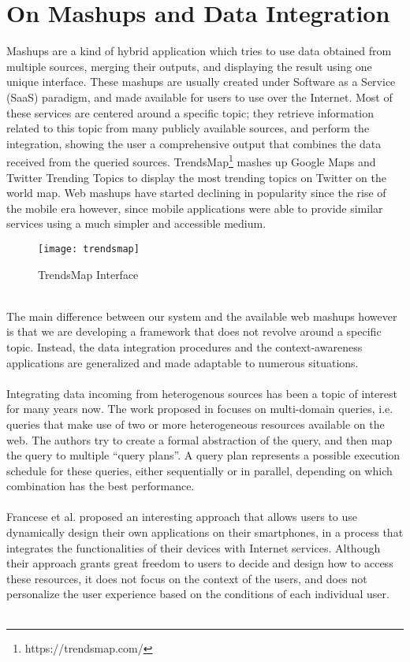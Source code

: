 \section{On Mashups and Data Integration}
Mashups are a kind of hybrid application which tries to use data obtained from multiple sources, merging their outputs, and displaying the result using one unique interface. These mashups are usually created under Software as a Service (SaaS) paradigm, and made available for users to use over the Internet. Most of these services are centered around a specific topic; they retrieve information related to this topic from many publicly available sources, and perform the integration, showing the user a comprehensive output that combines the data received from the queried sources. TrendsMap\footnote{https://trendsmap.com/} mashes up Google Maps and Twitter Trending Topics to display the most trending topics on Twitter on the world map. Web mashups have started declining in popularity since the rise of the mobile era however, since mobile applications were able to provide similar services using a much simpler and accessible medium.
\begin{figure}[h]
\centering
\texttt{[image: trendsmap]}
\caption{TrendsMap Interface}
\end{figure}
\\
The main difference between our system and the available web mashups however is that we are developing a framework that does not revolve around a specific topic. Instead, the data integration procedures and the context-awareness applications are generalized and made adaptable to numerous situations.\\\\
Integrating data incoming from heterogenous sources has been a topic of interest for many years now. The work proposed in \cite{braga} focuses on multi-domain queries, i.e. queries that make use of two or more heterogeneous resources available on the web. The authors try to create a formal abstraction of the query, and then map the query to multiple ``query plans''. A query plan represents a possible execution schedule for these queries, either sequentially or in parallel, depending on which combination has the best performance.\\\\
Francese et al.\cite{dynamicapp} proposed an interesting approach that allows users to use dynamically design their own applications on their smartphones, in a process that integrates the functionalities of their devices with Internet services. Although their approach grants great freedom to users to decide and design how to access these resources, it does not focus on the context of the users, and does not personalize the user experience based on the conditions of each individual user.\\\\
